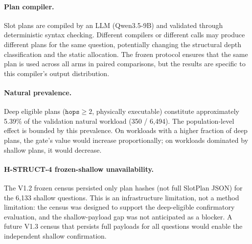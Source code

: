 \paragraph{Plan compiler.}
Slot plans are compiled by an LLM (Qwen3.5-9B) and validated through deterministic syntax checking. Different compilers or different calls may produce different plans for the same question, potentially changing the structural depth classification and the static allocation. The frozen protocol ensures that the same plan is used across all arms in paired comparisons, but the results are specific to this compiler's output distribution.

\paragraph{Natural prevalence.}
Deep eligible plans ($\texttt{hops} \geq 2$, physically executable) constitute approximately 5.39\% of the validation natural workload (350 / 6,494). The population-level effect is bounded by this prevalence. On workloads with a higher fraction of deep plans, the gate's value would increase proportionally; on workloads dominated by shallow plans, it would decrease.

\paragraph{H-STRUCT-4 frozen-shallow unavailability.}
The V1.2 frozen census persisted only plan hashes (not full SlotPlan JSON) for the 6,133 shallow questions. This is an infrastructure limitation, not a method limitation: the census was designed to support the deep-eligible confirmatory evaluation, and the shallow-payload gap was not anticipated as a blocker. A future V1.3 census that persists full payloads for all questions would enable the independent shallow confirmation.
